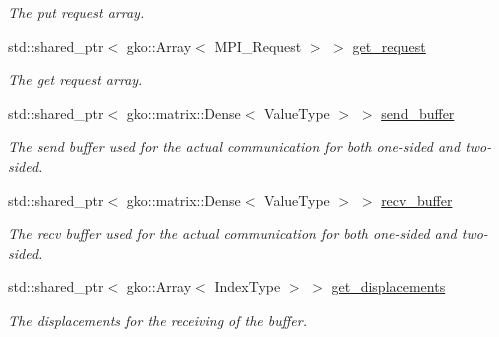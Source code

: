 \begin{DoxyCompactItemize}
\begin{DoxyCompactList}\small\item\em The put request array. \end{DoxyCompactList}\item 
\mbox{\label{structschwz_1_1Communicate_1_1comm__struct_a50ab7728b835b599c376a7fe11dbe513}} 
std\+::shared\+\_\+ptr$<$ gko\+::\+Array$<$ M\+P\+I\+\_\+\+Request $>$ $>$ \hyperlink{structschwz_1_1Communicate_1_1comm__struct_a50ab7728b835b599c376a7fe11dbe513}{get\+\_\+request}
\begin{DoxyCompactList}\small\item\em The get request array. \end{DoxyCompactList}\item 
\mbox{\label{structschwz_1_1Communicate_1_1comm__struct_aacb91f128f3bb0bf4cd5d43716bbbcee}} 
std\+::shared\+\_\+ptr$<$ gko\+::matrix\+::\+Dense$<$ Value\+Type $>$ $>$ \hyperlink{structschwz_1_1Communicate_1_1comm__struct_aacb91f128f3bb0bf4cd5d43716bbbcee}{send\+\_\+buffer}
\begin{DoxyCompactList}\small\item\em The send buffer used for the actual communication for both one-\/sided and two-\/sided. \end{DoxyCompactList}\item 
\mbox{\label{structschwz_1_1Communicate_1_1comm__struct_a78779301f90436a717cc8dcf50a5d717}} 
std\+::shared\+\_\+ptr$<$ gko\+::matrix\+::\+Dense$<$ Value\+Type $>$ $>$ \hyperlink{structschwz_1_1Communicate_1_1comm__struct_a78779301f90436a717cc8dcf50a5d717}{recv\+\_\+buffer}
\begin{DoxyCompactList}\small\item\em The recv buffer used for the actual communication for both one-\/sided and two-\/sided. \end{DoxyCompactList}\item 
\mbox{\label{structschwz_1_1Communicate_1_1comm__struct_a8946e6739f13e98a87ac8ef3f0f808d6}} 
std\+::shared\+\_\+ptr$<$ gko\+::\+Array$<$ Index\+Type $>$ $>$ \hyperlink{structschwz_1_1Communicate_1_1comm__struct_a8946e6739f13e98a87ac8ef3f0f808d6}{get\+\_\+displacements}
\begin{DoxyCompactList}\small\item\em The displacements for the receiving of the buffer. \end{DoxyCompactList}\item 

\end{DoxyCompactItemize}
